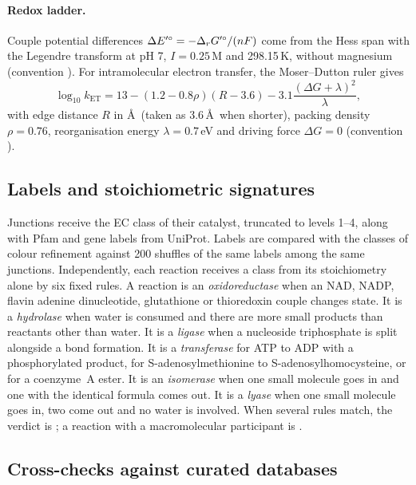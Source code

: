 \paragraph{Redox ladder.}
Couple potential differences $\Delta E'^\circ=-\Delta_r G'^\circ/(nF)$ come from the Hess span with the Legendre transform at pH 7, $I=0.25$\,M and 298.15\,K, without magnesium (convention ).
For intramolecular electron transfer, the Moser--Dutton ruler gives \citep{moser1992nature,page1999natural}
\begin{equation}
  \log_{10}k_{\mathrm{ET}} = 13-(1.2-0.8\rho)(R-3.6)-3.1\frac{(\Delta G+\lambda)^2}{\lambda},
\end{equation}
with edge distance $R$ in \AA\ (taken as 3.6\,\AA\ when shorter), packing density $\rho=0.76$, reorganisation energy $\lambda=0.7$\,eV and driving force $\Delta G=0$ (convention ).

\subsection{Labels and stoichiometric signatures}
\label{sec:labels}

Junctions receive the EC class of their catalyst, truncated to levels 1--4, along with Pfam and gene labels from UniProt.
Labels are compared with the classes of colour refinement against 200 shuffles of the same labels among the same junctions.
Independently, each reaction receives a class from its stoichiometry alone by six fixed rules.
A reaction is an \emph{oxidoreductase} when an NAD, NADP, flavin adenine dinucleotide, glutathione or thioredoxin couple changes state.
It is a \emph{hydrolase} when water is consumed and there are more small products than reactants other than water.
It is a \emph{ligase} when a nucleoside triphosphate is split alongside a bond formation.
It is a \emph{transferase} for ATP to ADP with a phosphorylated product, for S-adenosylmethionine to S-adenosylhomocysteine, or for a coenzyme~A ester.
It is an \emph{isomerase} when one small molecule goes in and one with the identical formula comes out.
It is a \emph{lyase} when one small molecule goes in, two come out and no water is involved.
When several rules match, the verdict is ; a reaction with a macromolecular participant is .

\subsection{Cross-checks against curated databases}
\label{sec:xref}


